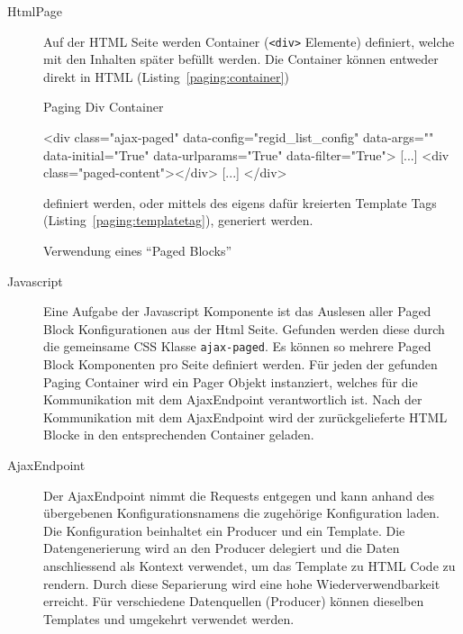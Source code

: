 \begin{description}
\item[HtmlPage]
Auf der HTML Seite werden Container (\texttt{<div>} Elemente) definiert, welche mit den Inhalten später befüllt werden. Die Container können entweder direkt in HTML  (Listing~\ref{paging:container})

\begin{listing}
\caption{Paging Div Container}
\label{paging:container}
\begin{htmlcode}
<div class="ajax-paged"
     data-config="regid_list_config"
     data-args="{}"
     data-initial="True"
     data-urlparams="True"
     data-filter="True">
	[...]
	<div class="paged-content"></div>
	[...]
</div>
\end{htmlcode}
\end{listing}

definiert werden, oder mittels des eigens dafür kreierten Template Tags (Listing~\ref{paging:templatetag}), generiert werden.

\begin{listing}
\caption{Verwendung eines \enquote{Paged Blocks}}
\label{paging:templatetag}
\begin{pythoncode}
{%
\end{pythoncode}
\end{listing}


\item[Javascript]
Eine Aufgabe der Javascript Komponente ist das Auslesen aller Paged Block Konfigurationen aus der Html Seite. Gefunden werden diese durch die gemeinsame CSS Klasse \texttt{ajax-paged}. Es können so mehrere Paged Block Komponenten pro Seite definiert werden. Für jeden der gefunden Paging Container wird ein Pager Objekt instanziert, welches für die Kommunikation mit dem AjaxEndpoint verantwortlich ist.
Nach der Kommunikation mit dem AjaxEndpoint wird der zurückgelieferte HTML Blocke in den entsprechenden Container geladen.

\item [AjaxEndpoint]
Der AjaxEndpoint nimmt die Requests entgegen und kann anhand des übergebenen Konfigurationsnamens die zugehörige Konfiguration laden.
Die Konfiguration beinhaltet ein Producer und ein Template.
Die Datengenerierung wird an den Producer delegiert und die Daten anschliessend als Kontext verwendet, um das Template zu HTML Code zu rendern.
Durch diese Separierung wird eine hohe Wiederverwendbarkeit erreicht. Für verschiedene Datenquellen (Producer) können dieselben Templates und umgekehrt verwendet werden.


\end{description}
